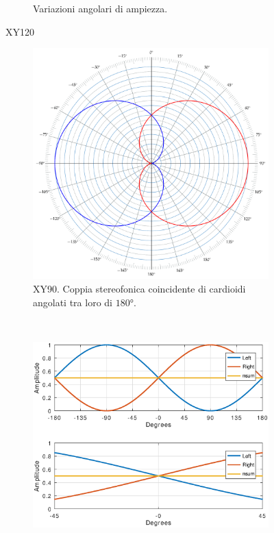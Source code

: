 \begin{figure}[t]
\begin{subfigure}[t]{0.99\textwidth}
        \caption{Variazioni angolari di ampiezza.}%
        \label{plot:xy120}
    \end{subfigure}
    \caption{XY120}
    \label{sp:xy120}
\end{figure}

\clearpage

\begin{figure}[t]
    \centering
    \begin{subfigure}[t]{0.99\textwidth}
        \centering
        \includegraphics[width=11cm]{CAPITOLI/_TIKZ/POLAR/xy180}
        \caption{XY90. Coppia stereofonica coincidente di cardioidi angolati tra loro di $180°$.}%
        \label{pol:xy120sp}
    \end{subfigure}%
    \\
    \begin{subfigure}[t]{0.99\textwidth}
        \centering
        \includegraphics[width=12.5cm]{CAPITOLI/1000/IMG/xy180sub}

\end{subfigure}
\end{figure}
